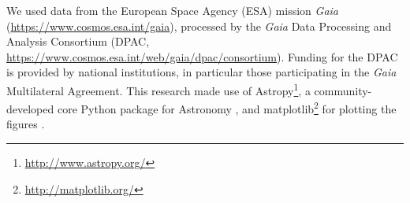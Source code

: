 \documentclass[RNAAS]{aastex62}
\newcommand\gaia{\textit{Gaia}}
\begin{document}
\acknowledgments

We used data from the European Space Agency (ESA) mission {\gaia} (\url{https://www.cosmos.esa.int/gaia}), processed by the {\gaia} Data Processing and Analysis Consortium (DPAC, \url{https://www.cosmos.esa.int/web/gaia/dpac/consortium}). Funding for the DPAC is provided by national institutions, in particular those participating in the {\gaia} Multilateral Agreement. This research made use of Astropy\footnote{\url{http://www.astropy.org/}}, a community-developed core Python package for Astronomy \citep{Robitaille13}, and matplotlib\footnote{\url{http://matplotlib.org/}} for plotting the figures \citep{Hunter07}.


\end{document}
